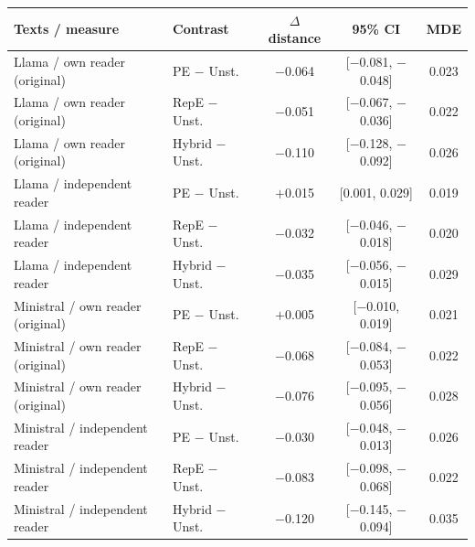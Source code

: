 \begin{tabular}{llccc}
\toprule
Texts / measure & Contrast & $\Delta$ distance & 95\% CI & MDE \\
\midrule
Llama / own reader (original) & PE $-$ Unst. & $-$0.064 & [$-$0.081, $-$0.048] & 0.023 \\
Llama / own reader (original) & RepE $-$ Unst. & $-$0.051 & [$-$0.067, $-$0.036] & 0.022 \\
Llama / own reader (original) & Hybrid $-$ Unst. & $-$0.110 & [$-$0.128, $-$0.092] & 0.026 \\
Llama / independent reader & PE $-$ Unst. & $+$0.015 & [0.001, 0.029] & 0.019 \\
Llama / independent reader & RepE $-$ Unst. & $-$0.032 & [$-$0.046, $-$0.018] & 0.020 \\
Llama / independent reader & Hybrid $-$ Unst. & $-$0.035 & [$-$0.056, $-$0.015] & 0.029 \\
Ministral / own reader (original) & PE $-$ Unst. & $+$0.005 & [$-$0.010, 0.019] & 0.021 \\
Ministral / own reader (original) & RepE $-$ Unst. & $-$0.068 & [$-$0.084, $-$0.053] & 0.022 \\
Ministral / own reader (original) & Hybrid $-$ Unst. & $-$0.076 & [$-$0.095, $-$0.056] & 0.028 \\
Ministral / independent reader & PE $-$ Unst. & $-$0.030 & [$-$0.048, $-$0.013] & 0.026 \\
Ministral / independent reader & RepE $-$ Unst. & $-$0.083 & [$-$0.098, $-$0.068] & 0.022 \\
Ministral / independent reader & Hybrid $-$ Unst. & $-$0.120 & [$-$0.145, $-$0.094] & 0.035 \\
\bottomrule
\end{tabular}
